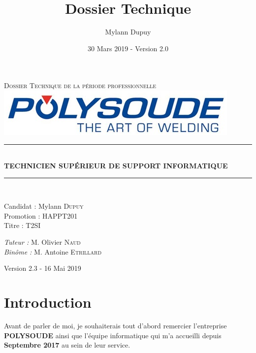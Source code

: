 \documentclass[11pt,a4paper,oneside]{article}
\author{Mylann Dupuy}
\title{Dossier Technique}
\date{30 Mars 2019 - Version 2.0}
\newcommand{\HRule}{\rule{\linewidth}{0.5mm}}
\begin{document}
\begin{titlepage}
  \begin{sffamily}
  \begin{center}

    \textsc{\LARGE Dossier Technique de la période professionnelle}\\[6.5cm]
    \includegraphics[scale=1]{Ressources/polysoude.jpg}
        \HRule \\[0.4cm]
        { \huge \bfseries TECHNICIEN SUPÉRIEUR DE SUPPORT INFORMATIQUE\\[0.4cm] }
        \HRule \\[6.5cm]

    \begin{minipage}{0.4\textwidth}
      \begin{flushleft} \large
        Candidat : Mylann \textsc{Dupuy}\\
        Promotion : HAPPT201\\
        Titre : T2SI
      \end{flushleft}
    \end{minipage}
    \begin{minipage}{0.5\textwidth}
      \begin{flushright} \large
        \emph{Tuteur :} M. Olivier \textsc{Naud}\\
        \emph{Binôme :} M. Antoine \textsc{Etrillard}\\
      \end{flushright}
    \end{minipage}

    \vfill

    {\large Version 2.3 - 16 Mai 2019}

  \end{center}
  \end{sffamily}
\end{titlepage}
\newpage

\tableofcontents
\newpage
\setcounter{page}{2}
\newpage

\section*{Introduction}
Avant de parler de moi, je souhaiterais tout d’abord remercier l’entreprise \textbf{POLYSOUDE} ainsi que l'équipe informatique qui m’a accueilli depuis \textbf{Septembre 2017} au sein de leur service.
\end{document}
